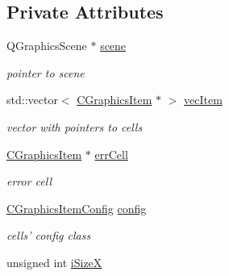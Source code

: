 \subsection*{Private Attributes}
\begin{DoxyCompactItemize}
\item 
\hypertarget{classCGraphicsScene_a82fd51912344eb7a4ecd122c2f769f0e}{
QGraphicsScene $\ast$ \hyperlink{classCGraphicsScene_a82fd51912344eb7a4ecd122c2f769f0e}{scene}}
\label{classCGraphicsScene_a82fd51912344eb7a4ecd122c2f769f0e}

\begin{DoxyCompactList}\small\item\em pointer to scene \item\end{DoxyCompactList}\item 
\hypertarget{classCGraphicsScene_a0af26a9d7c12992b4c9799b74d5a4f80}{
std::vector$<$ \hyperlink{classCGraphicsItem}{CGraphicsItem} $\ast$ $>$ \hyperlink{classCGraphicsScene_a0af26a9d7c12992b4c9799b74d5a4f80}{vecItem}}
\label{classCGraphicsScene_a0af26a9d7c12992b4c9799b74d5a4f80}

\begin{DoxyCompactList}\small\item\em vector with pointers to cells \item\end{DoxyCompactList}\item 
\hypertarget{classCGraphicsScene_aa2cf045197a92c6fd9e92f2a83bae95f}{
\hyperlink{classCGraphicsItem}{CGraphicsItem} $\ast$ \hyperlink{classCGraphicsScene_aa2cf045197a92c6fd9e92f2a83bae95f}{errCell}}
\label{classCGraphicsScene_aa2cf045197a92c6fd9e92f2a83bae95f}

\begin{DoxyCompactList}\small\item\em error cell \item\end{DoxyCompactList}\item 
\hypertarget{classCGraphicsScene_a4e1432ac1c62f8ca0924ff678796b7d9}{
\hyperlink{classCGraphicsItemConfig}{CGraphicsItemConfig} \hyperlink{classCGraphicsScene_a4e1432ac1c62f8ca0924ff678796b7d9}{config}}
\label{classCGraphicsScene_a4e1432ac1c62f8ca0924ff678796b7d9}

\begin{DoxyCompactList}\small\item\em cells' config class \item\end{DoxyCompactList}\item 
\hypertarget{classCGraphicsScene_a1e51077925b34221ac1c77b5556ebcc2}{
unsigned int \hyperlink{classCGraphicsScene_a1e51077925b34221ac1c77b5556ebcc2}{iSizeX}}
\label{classCGraphicsScene_a1e51077925b34221ac1c77b5556ebcc2}


\end{DoxyCompactItemize}
